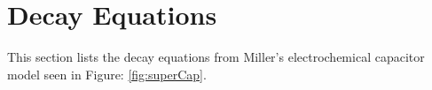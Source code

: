 \newpage
\section{Decay Equations}
\label{app:decayEqs}
This section lists the decay equations from Miller's electrochemical capacitor model \cite{electrochem_intro} seen in Figure: \ref{fig:superCap}.


